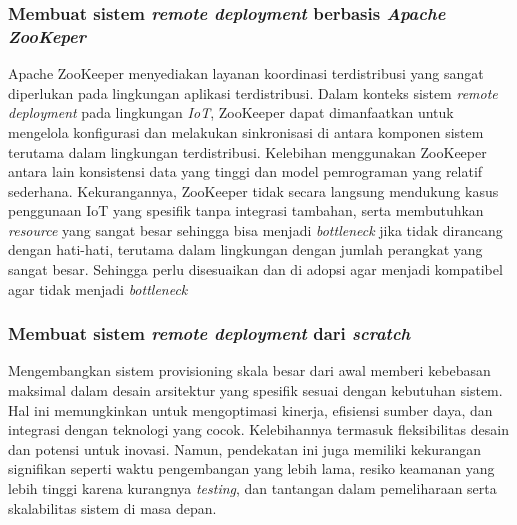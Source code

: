 \subsubsection{Membuat sistem \textit{remote deployment} berbasis \textit{Apache ZooKeper}}
Apache ZooKeeper menyediakan layanan koordinasi terdistribusi yang sangat diperlukan pada lingkungan aplikasi terdistribusi. Dalam konteks sistem \textit{remote deployment} pada lingkungan \textit{IoT}, ZooKeeper dapat dimanfaatkan untuk mengelola konfigurasi dan melakukan sinkronisasi di antara komponen sistem terutama dalam lingkungan terdistribusi. Kelebihan menggunakan ZooKeeper antara lain konsistensi data yang tinggi dan model pemrograman yang relatif sederhana. Kekurangannya, ZooKeeper tidak secara langsung mendukung kasus penggunaan IoT yang spesifik tanpa integrasi tambahan, serta membutuhkan \textit{resource} yang sangat besar sehingga bisa menjadi \textit{bottleneck} jika tidak dirancang dengan hati-hati, terutama dalam lingkungan dengan jumlah perangkat yang sangat besar. Sehingga perlu disesuaikan dan di adopsi agar menjadi kompatibel agar tidak menjadi \textit{bottleneck}

\subsubsection{Membuat sistem \textit{remote deployment} dari \textit{scratch}}
Mengembangkan sistem provisioning skala besar dari awal memberi kebebasan maksimal dalam desain arsitektur yang spesifik sesuai dengan kebutuhan sistem. Hal ini memungkinkan untuk mengoptimasi kinerja, efisiensi sumber daya, dan integrasi dengan teknologi yang cocok. Kelebihannya termasuk fleksibilitas desain dan potensi untuk inovasi. Namun, pendekatan ini juga memiliki kekurangan signifikan seperti waktu pengembangan yang lebih lama, resiko keamanan yang lebih tinggi karena kurangnya \textit{testing}, dan tantangan dalam pemeliharaan serta skalabilitas sistem di masa depan.